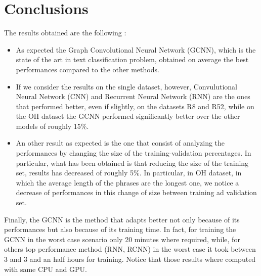 \section{Conclusions}
The results obtained are the following :
\begin{itemize}
    \item As expected the Graph Convolutional Neural Network (GCNN), which is the state of the art in text classification problem, obtained on average the best performances compared to the other methods.    
    \item If we consider the results on the single dataset, however, Convulutional Neural Network (CNN) and Recurrent Neural Network (RNN) are the ones that performed better, even if slightly, on the datasets R8 and R52, while on the OH dataset the GCNN performed significantly better over the other models of roughly 15\%. 
    \item An other result as expected is the one that consist of analyzing the performances by changing the size of the training-validation percentages. In particular, what has been obtained is that reducing the size of the training set,  results has decreased of roughly 5\%. In particular, in OH dataset, in which the average length of the phrases are the longest one, we notice a decrease of performances in this change of size between training ad validation set.
\end{itemize}
Finally, the GCNN is the method that adapts better not only because of its performances but also because of its training time. In fact, for training the GCNN in the worst case scenario only 20 minutes where required, while, for others top performance method (RNN, RCNN) in the worst case it took between 3 and 3 and an half hours for training.
Notice that those results where computed with same CPU and GPU.